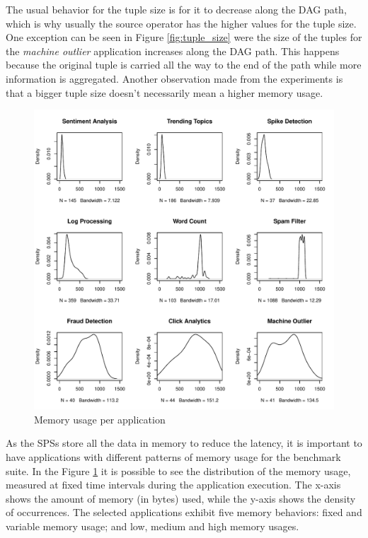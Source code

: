 \documentclass[ppgc,diss,english]{iiufrgs}
\begin{document}
The usual behavior for the tuple size is for it to decrease along the DAG path, which is why usually the source operator has the higher values for the tuple size. One exception can be seen in Figure \ref{fig:tuple_size} were the size of the tuples for the \emph{machine outlier} application increases along the DAG path. This happens because the original tuple is carried all the way to the end of the path while more information is aggregated. Another observation made from the experiments is that a bigger tuple size doesn't necessarily mean a higher memory usage.

\begin{figure}[ht!]
    \centering
	\includegraphics[width=.8\textwidth]{images/memory_usage.pdf}
	\caption{Memory usage per application}
	\label{fig:memory_usage}
\end{figure}

As the SPSs store all the data in memory to reduce the latency, it is important to have applications with different patterns of memory usage for the benchmark suite. In the Figure \ref{fig:memory_usage} it is possible to see the distribution of the memory usage, measured at fixed time intervals during the application execution. The x-axis shows the amount of memory (in bytes) used, while the y-axis shows the density of occurrences. The selected applications exhibit five memory behaviors: fixed and variable memory usage; and low, medium and high memory usages.

\end{document}
